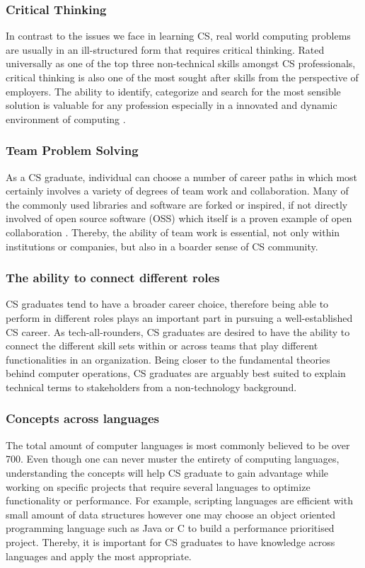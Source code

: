 \documentclass[a4paper, 11pt]{report}
\begin{document}
\subsubsection{Critical Thinking}
In contrast to the issues we face in learning CS, real world computing problems are usually in an ill-structured form that requires critical thinking. Rated universally as one of the top three non-technical skills amongst CS professionals, critical thinking is also one of the most sought after skills from the perspective of employers. The ability to identify, categorize and search for the most sensible solution is valuable for any profession especially in a innovated and dynamic environment of computing \cite{baird2019employers}. 
\subsubsection{Team Problem Solving}
As a CS graduate, individual can choose a number of career paths in which most certainly involves a variety of degrees of team work and collaboration. Many of the commonly used libraries and software are forked or inspired, if not directly involved of open source software (OSS) which itself is a proven example of open collaboration \cite{levine2014open}. Thereby, the ability of team work is essential, not only within institutions or companies, but also in a boarder sense of CS community.
\subsubsection{The ability to connect different roles}
CS graduates tend to have a broader career choice, therefore being able to perform in different roles plays an important part in pursuing a well-established CS career. As tech-all-rounders, CS graduates are desired to have the ability to connect the different skill sets within or across teams that play different functionalities in an organization. Being closer to the fundamental theories behind computer operations, CS graduates are arguably best suited to explain technical terms to stakeholders from a non-technology background.
\subsubsection{Concepts across languages}
The total amount of computer languages is most commonly believed to be over 700. Even though one can never muster the entirety of computing languages, understanding the concepts will help CS graduate to gain advantage while working on specific projects that require several languages to optimize functionality or performance. For example, scripting languages are efficient with small amount of data structures however one may choose an object oriented programming language such as Java or C to build a performance prioritised project. Thereby, it is important for CS graduates to have knowledge across languages and apply the most appropriate.
\end{document}
